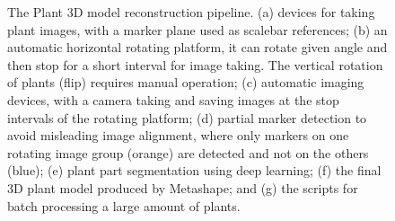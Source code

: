 \begin{figure}[htb]
  \begin{center}
  \end{center}
  \caption[The plant 3D model reconstruction pipeline]{
    The Plant 3D model reconstruction pipeline. (a) devices for taking plant images, with a marker plane used as scalebar references; (b) an automatic horizontal rotating platform, it can rotate given angle and then stop for a short interval for image taking. The vertical rotation of plants (flip) requires manual operation; (c) automatic imaging devices, with a camera taking and saving images at the stop intervals of the rotating platform; (d) partial marker detection to avoid misleading image alignment, where only markers on one rotating image group (orange) are detected and not on the others (blue); (e) plant part segmentation using deep learning; (f) the final 3D plant model produced by Metashape; and (g) the scripts for batch processing a large amount of plants.
  }
  \label{fig:des2}
\end{figure}